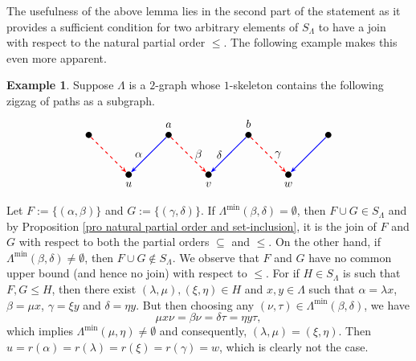 \documentclass[a4paper,reqno,11pt]{amsart}
\numberwithin{equation}{section}
\theoremstyle{definition}
\newtheorem{example}[thm]{Example}
\theoremstyle{remark}
\begin{document}
The usefulness of the above lemma lies in the second part of the statement as it provides a sufficient condition for two arbitrary elements of $S_\Lambda$ to have a join with respect to the natural partial order $\le$. The following example makes this even more apparent.
\begin{example}\label{ex two elements with no join}
Suppose $\Lambda$ is a $2$-graph whose $1$-skeleton contains the following zigzag of paths as a subgraph. 
\[
\begin{tikzpicture}[
    vertex/.style={circle, fill=black, inner sep=2pt},
    bluearrow/.style={-{Stealth[length=5pt]}, thick, blue},
    redarrow/.style={-{Stealth[length=5pt]}, thick, red, dashed},
    every node/.style={font=\large}
]

\node[vertex, label=above:\normalsize{$a$}] (a) at (1.25,1.25) {};
\node[vertex, label=below:\normalsize{$u$}] (u) at (0,0) {};
\node[vertex, label=below:\normalsize{$v$}] (v) at (2.5,0) {};

\node[vertex, label=above:\normalsize{$b$}] (b) at (3.75,1.25) {};
\node[vertex, label=below:\normalsize{$w$}] (w) at (5,0) {};

\node[vertex] (x) at (-1.25,1.25) {};
\node[vertex] (y) at (6.25,1.25) {};

\draw[bluearrow] (a) -- node[left=2pt] {\normalsize{\textcolor{black}{$\alpha$}}} (u);
\draw[redarrow]  (a) -- node[right=2pt] {\normalsize{\textcolor{black}{$\beta$}}} (v);

\draw[bluearrow] (b) -- node[left=2pt] {\normalsize{\textcolor{black}{$\delta$}}} (v);
\draw[redarrow]  (b) -- node[right=2pt] {\normalsize{\textcolor{black}{$\gamma$}}} (w);

\draw[redarrow]  (x) -- node[right=2pt] {} (u);
\draw[bluearrow]  (y) -- node[right=2pt] {} (w);

\end{tikzpicture}
\]
Let $F:=\{(\alpha,\beta)\}$ and $G:=\{(\gamma,\delta)\}$. If $\Lambda^{\min}(\beta,\delta)=\emptyset$, then $F\cup G\in S_\Lambda$ and by Proposition \ref{pro natural partial order and set-inclusion}, it is the join of $F$ and $G$ with respect to both the partial orders $\subseteq$ and $\le$. On the other hand, if $\Lambda^{\min}(\beta,\delta)\neq \emptyset$, then $F\cup G\notin S_\Lambda$. We observe that $F$ and $G$ have no common upper bound (and hence no join) with respect to $\le$. For if $H\in S_\Lambda$ is such that $F,G\le H$, then there exist $(\lambda,\mu), (\xi,\eta)\in H$ and $x,y\in \Lambda$ such that $\alpha=\lambda x$, $\beta=\mu x$, $\gamma=\xi y$ and $\delta=\eta y$. But then choosing any $(\nu,\tau)\in \Lambda^{\min}(\beta,\delta)$, we have \[\mu x \nu=\beta \nu=\delta \tau=\eta y \tau,\] which implies $\Lambda^{\min}(\mu,\eta)\neq \emptyset$ and consequently, $(\lambda,\mu)=(\xi,\eta)$. Then $u=r(\alpha)=r(\lambda)=r(\xi)=r(\gamma)=w$, which is clearly not the case. 
\end{example}
\end{document}
